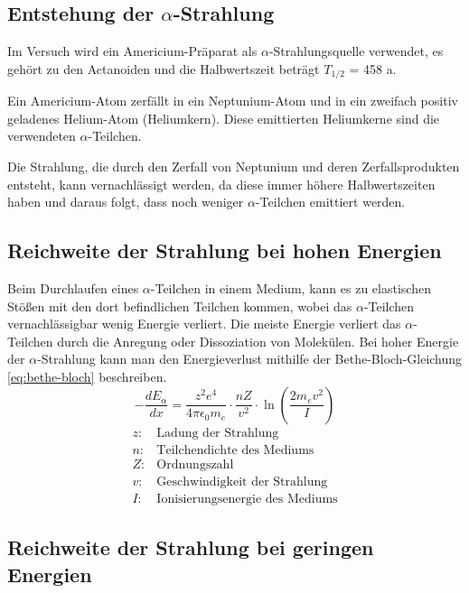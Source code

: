 \subsection{Entstehung der $\alpha$-Strahlung}

Im Versuch wird ein Americium-Präparat als $\alpha$-Strahlungsquelle
verwendet, es gehört zu den Actanoiden und die Halbwertszeit beträgt $T_{1/2}$ = 458 a.

Ein Americium-Atom zerfällt in ein Neptunium-Atom und in ein
zweifach positiv geladenes Helium-Atom (Heliumkern). Diese emittierten Heliumkerne sind die verwendeten $\alpha$-Teilchen.

Die Strahlung, die durch den Zerfall von Neptunium und deren Zerfallsprodukten entsteht, kann vernachlässigt werden, da diese immer höhere Halbwertszeiten haben und daraus folgt, dass noch weniger $\alpha$-Teilchen emittiert werden.

\subsection{Reichweite der Strahlung bei hohen Energien}

Beim Durchlaufen eines $\alpha$-Teilchen in einem Medium, kann es zu elastischen Stößen mit den dort befindlichen Teilchen kommen, wobei das
$\alpha$-Teilchen vernachlässigbar wenig Energie verliert. Die meiste Energie verliert das $\alpha$-Teilchen durch die Anregung oder Dissoziation von Molekülen. Bei hoher Energie der $\alpha$-Strahlung kann man den Energieverlust mithilfe der Bethe-Bloch-Gleichung \eqref{eq:bethe-bloch} beschreiben.
\begin{equation}
  \label{eq:bethe-bloch}
  -\frac{d E_\alpha}{dx} = \frac{z^2 e^4}{4 \pi \epsilon_0 m_e} \cdot 
  \frac{n Z}{v^2} \cdot \ln \left(\frac{2 m_e v^2}{I}\right)
\end{equation}
\begin{align*}
  z\colon &\text{Ladung der Strahlung}\\
  n\colon &\text{Teilchendichte des Mediums}\\
  Z\colon &\text{Ordnungszahl}\\
  v\colon &\text{Geschwindigkeit der Strahlung}\\
  I\colon &\text{Ionisierungsenergie des Mediums}
\end{align*}

\subsection{Reichweite der Strahlung bei geringen Energien}

